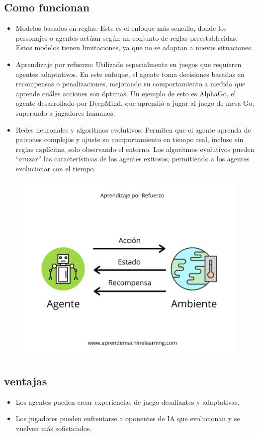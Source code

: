 \documentclass[12pt]{article}
\begin{document}
\subsection{Como funcionan}
\begin{itemize}
    \item Modelos basados en reglas:
    Este es el enfoque más sencillo, donde los personajes o agentes actúan según un conjunto de reglas preestablecidas. 
    Estos modelos tienen limitaciones, ya que no se adaptan a nuevas situaciones.
    \item Aprendizaje por refuerzo: 
    Utilizado especialmente en juegos que requieren agentes adaptativos. 
    En este enfoque, el agente toma decisiones basadas en recompensas o penalizaciones, mejorando su comportamiento a 
    medida que aprende cuáles acciones son óptimas. Un ejemplo de esto es AlphaGo, el agente desarrollado por DeepMind, 
    que aprendió a jugar al juego de mesa Go, superando a jugadores humanos.
    \item Redes neuronales y algoritmos evolutivos: 
    Permiten que el agente aprenda de patrones complejos y ajuste su comportamiento en tiempo real, incluso sin reglas explícitas, 
    solo observando el entorno. Los algoritmos evolutivos pueden “cruzar” las características de los agentes exitosos, permitiendo a 
    los agentes evolucionar con el tiempo.
\end{itemize}

\begin{figure}[h!]
    \centering
    \includegraphics[width=.6\textwidth]{AprendizajeRefuerzo-global.png}
    \label{fig:my_label}
\end{figure}

\subsection{ventajas}
\begin{itemize}
    \item Los agentes pueden crear experiencias de juego desafiantes y adaptativas.
    \item Los jugadores pueden enfrentarse a oponentes de IA que evolucionan y se vuelven más sofisticados.
\end{itemize}
\end{document}
